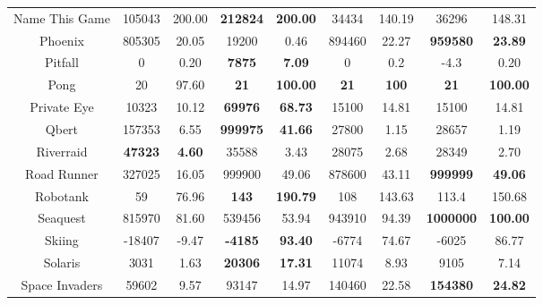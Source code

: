 \documentclass[nohyperref]{article}
\newcommand{\best}[1]{\textbf{#1}}
\theoremstyle{plain}
\begin{document}
\begin{table}[!hb]
\begin{center}
\begin{tabular}{| c | c c |  c c| c c| c c|}
 Name This Game     &105043    &200.00              &\textbf{212824}       &\textbf{200.00}                & 34434             &140.19          &36296           &148.31\\
 Phoenix        &805305        &20.05               &19200                 &0.46                           & 894460     &22.27    &\textbf{959580}          &\textbf{23.89}\\
 Pitfall        &0             &0.20                &\textbf{7875}          &\textbf{7.09   }               & 0                 &0.2            &-4.3            &0.20 \\
 Pong           &20            &97.60               &\textbf{21}            &\textbf{100.00 }               & \best{21}         &\best{100}     &\textbf{21}              &\textbf{100.00}       \\
 Private Eye    &10323         &10.12               &\textbf{69976}        &\textbf{68.73  }               & 15100             &14.81           &15100           &14.81  \\
 Qbert          &157353        &6.55                &\textbf{999975}       &\textbf{41.66  }               & 27800             &1.15            &28657           &1.19\\
 Riverraid      &\textbf{47323}&\textbf{4.60}       &35588                 &3.43                           & 28075             &2.68            &28349           &2.70\\
 Road Runner    &327025        &16.05               &999900        &49.06                 & 878600            &43.11          &\textbf{999999}          &\textbf{49.06}\\
 Robotank       &59            &76.96               &\textbf{143}           &\textbf{190.79 }               & 108               &143.63         &113.4           &150.68\\
 Seaquest       &815970        &81.60               &539456                 &53.94                 &943910	             &94.39   &\textbf{1000000}          &\textbf{100.00}\\
 Skiing         &-18407        &-9.47               &\textbf{-4185}        &\textbf{93.40  }               & -6774             &74.67           &-6025	         &86.77\\
 Solaris        &3031          &1.63                &\textbf{20306}        &\textbf{17.31  }               & 11074             &8.93            &9105            &7.14\\
 Space Invaders &59602         &9.57                &93147                 &14.97                          & 140460     &22.58    &\textbf{154380}          &\textbf{24.82}\\

\end{tabular}
\end{center}
\end{table}
\end{document}
